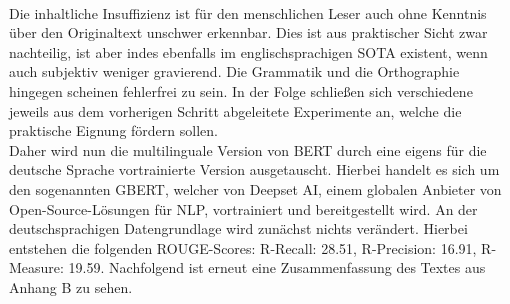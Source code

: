 \noindent{}\\
\newline

\noindent
Die inhaltliche Insuffizienz ist für den menschlichen Leser auch ohne Kenntnis über den Originaltext unschwer erkennbar. Dies ist aus praktischer Sicht zwar nachteilig, ist aber indes ebenfalls im englischsprachigen \ac{SOTA} existent, wenn auch subjektiv weniger gravierend. Die Grammatik und die Orthographie hingegen scheinen fehlerfrei zu sein. In der Folge schließen sich verschiedene jeweils aus dem vorherigen Schritt abgeleitete Experimente an, welche die praktische Eignung fördern sollen.\\

\noindent
Daher wird nun die multilinguale Version von \ac{BERT} durch eine eigens für die deutsche Sprache vortrainierte Version ausgetauscht. Hierbei handelt es sich um den sogenannten \ac{GBERT}, welcher von Deepset AI, einem globalen Anbieter von Open-Source-Lösungen für \ac{NLP}, vortrainiert und bereitgestellt wird. An der deutschsprachigen Datengrundlage wird zunächst nichts verändert. Hierbei entstehen die folgenden \ac{ROUGE}-Scores: R-Recall: 28.51, R-Precision: 16.91, R-Measure: 19.59. Nachfolgend ist erneut eine Zusammenfassung des Textes aus Anhang B zu sehen.\\

\noindent{}\\




